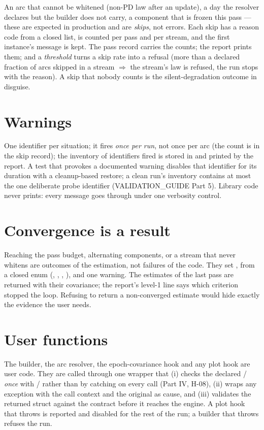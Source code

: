 An arc that cannot be whitened (non-PD law after an update), a day the resolver declares but the builder does not carry, a component that is frozen this pass --- these are expected in production and are \emph{skips}, not errors. Each skip has a reason code from a closed list, is counted per pass and per stream, and the first instance's message is kept. The pass record carries the counts; the report prints them; and a \emph{threshold} turns a skip rate into a refusal (more than a declared fraction of arcs skipped in a stream $\Rightarrow$ the stream's law is refused, the run stops with the reason). A skip that nobody counts is the silent-degradation outcome in disguise.

\section{Warnings}

One identifier per situation; it fires \emph{once per run}, not once per arc (the count is in the skip record); the inventory of identifiers fired is stored in  and printed by the report. A test that provokes a documented warning disables that identifier for its duration with a cleanup-based restore; a clean run's inventory contains at most the one deliberate probe identifier (VALIDATION\_GUIDE Part 5). Library code never prints: every message goes through  under one verbosity control.

\section{Convergence is a result}

Reaching the pass budget, alternating components, or a stream that never whitens are outcomes of the estimation, not failures of the code. They set ,  from a closed enum (, , , ), and one warning. The estimates of the last pass are returned with their covariance; the report's level-1 line says which criterion stopped the loop. Refusing to return a non-converged estimate would hide exactly the evidence the user needs.

\section{User functions}

The builder, the arc resolver, the epoch-covariance hook and any plot hook are user code. They are called through one wrapper that (i) checks the declared / \emph{once} with / rather than by catching  on every call (Part IV, H-08), (ii) wraps any exception with the call context and the original as cause, and (iii) validates the returned struct against the contract before it reaches the engine. A plot hook that throws is reported and disabled for the rest of the run; a builder that throws refuses the run.

